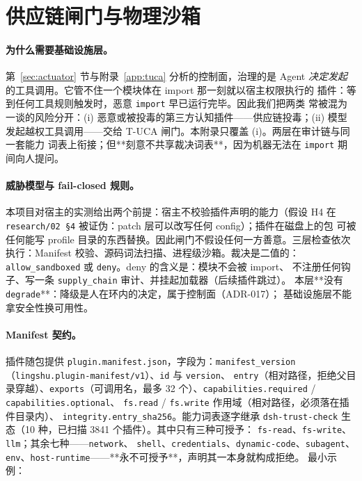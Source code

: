 
\section{供应链闸门与物理沙箱}

\paragraph{为什么需要基础设施层。}
第~\ref{sec:actuator} 节与附录~\ref{app:tuca} 分析的控制面，治理的是 Agent
\emph{决定发起}的工具调用。它管不住一个模块体在 import 那一刻就以宿主权限执行的
插件：等到任何工具规则触发时，恶意 \texttt{import} 早已运行完毕。因此我们把两类
常被混为一谈的风险分开：(i) 恶意或被投毒的第三方认知插件——供应链投毒；(ii) 模型
发起越权工具调用——交给 T-UCA 闸门。本附录只覆盖 (i)。两层在审计链与同一套能力
词表上衔接；但**刻意不共享裁决词表**，因为机器无法在 \texttt{import} 期间向人提问。

\paragraph{威胁模型与 fail-closed 规则。}
本项目对宿主的实测给出两个前提：宿主不校验插件声明的能力（假设 H4 在
\texttt{research/02 \S4} 被证伪：patch 层可以改写任何 config）；插件在磁盘上的包
可被任何能写 profile 目录的东西替换。因此闸门不假设任何一方善意。三层检查依次
执行：Manifest 校验、源码词法扫描、进程级沙箱。裁决是二值的：
\texttt{allow\_sandboxed} 或 \texttt{deny}。deny 的含义是：模块不会被 import、
不注册任何钩子、写一条 \texttt{supply\_chain} 审计、并挂起加载器（后续插件跳过）。
本层**没有 \texttt{degrade}**：降级是人在环内的决定，属于控制面（ADR-017）；
基础设施层不能拿安全性换可用性。

\paragraph{Manifest 契约。}
插件随包提供 \texttt{plugin.manifest.json}，字段为：\texttt{manifest\_version}
（\texttt{lingshu.plugin-manifest/v1}）、\texttt{id} 与 \texttt{version}、
\texttt{entry}（相对路径，拒绝父目录穿越）、\texttt{exports}（可调用名，最多 32
个）、\texttt{capabilities.required} / \texttt{capabilities.optional}、
\texttt{fs.read} / \texttt{fs.write} 作用域（相对路径，必须落在插件目录内）、
\texttt{integrity.entry\_sha256}。能力词表逐字继承
\texttt{dsh-trust-check} 生态（10 种，已扫描 3841 个插件）。其中只有三种可授予：
\texttt{fs-read}、\texttt{fs-write}、\texttt{llm}；其余七种——\texttt{network}、
\texttt{shell}、\texttt{credentials}、\texttt{dynamic-code}、\texttt{subagent}、
\texttt{env}、\texttt{host-runtime}——**永不可授予**，声明其一本身就构成拒绝。
最小示例：

